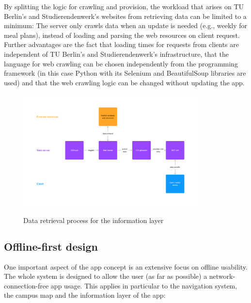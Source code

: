 By splitting the logic for crawling and provision, the workload that arises on TU Berlin's and Studierendenwerk's websites from retrieving data can be limited to a minimum: The server only crawls data when an update is needed (e.g., weekly for meal plans), instead of loading and parsing the web resources on client request. Further advantages are the fact that loading times for requests from clients are independent of TU Berlin's and Studierendenwerk's infrastructure, that the language for web crawling can be chosen independently from the programming framework (in this case Python with its Selenium \cite{selenium} and BeautifulSoup \cite{beautifulsoup4} libraries are used) and that the web crawling logic can be changed without updating the app.

\begin{figure}[H]
	\centering
	\includegraphics[width=0.85\textwidth]{images/information_layer_backend.png}\\
	\caption{Data retrieval process for the information layer}
\end{figure}


\subsection{Offline-first design}
One important aspect of the app concept is an extensive focus on offline usability. The whole system is designed to allow the user (as far as possible) a network-connection-free app usage. This applies in particular to the navigation system, the campus map and the information layer of the app:

